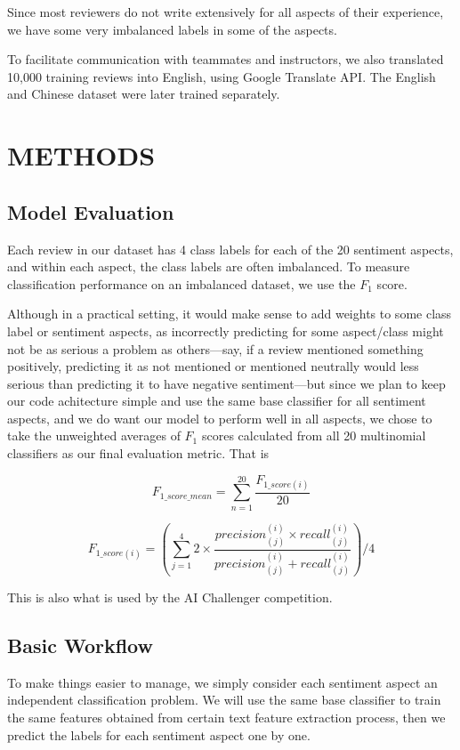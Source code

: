 \documentclass[compsoc]{IEEEtran}
\begin{document}
Since most reviewers do not write extensively for all aspects of their experience, we have some very imbalanced labels in some of the aspects.

To facilitate communication with teammates and instructors, we also translated 10,000 training reviews into English, using Google Translate API. The English and Chinese dataset were later trained separately.

\section{METHODS}

\subsection{Model Evaluation}

Each review in our dataset has 4 class labels for each of the 20 sentiment aspects, and within each aspect, the class labels are often imbalanced. To measure classification performance on an imbalanced dataset, we use the $F_1$ score.

Although in a practical setting, it would make sense to add weights to some class label or sentiment aspects, as incorrectly predicting for some aspect/class might not be as serious a problem as others---say, if a review mentioned something positively, predicting it as not mentioned or mentioned neutrally would less serious than predicting it to have negative sentiment---but since we plan to keep our code achitecture simple and use the same base classifier for all sentiment aspects, and we do want our model to perform well in all aspects, we chose to take the unweighted averages of $F_1$ scores calculated from all 20 multinomial classifiers as our final evaluation metric. That is

$$
F_{1\_score\_mean} = \sum^{20}_{n=1} \frac{F_{1\_score(i)}}{20}
$$

$$
F_{1\_score(i)} = \left(\sum_{j=1}^{4}
   2 \times \frac{ precision^{(i)}_{(j)} \times recall^{(i)}_{(j)} }{
   	 precision^{(i)}_{(j)} + recall^{(i)}_{(j)} 
   }
\right) / 4
$$

This is also what is used by the AI Challenger competition.

\subsection{Basic Workflow}

To make things easier to manage, we simply consider each sentiment aspect an independent classification problem. We will use the same base classifier to train the same features obtained from certain text feature extraction process, then we predict the labels for each sentiment aspect one by one.
\end{document}
